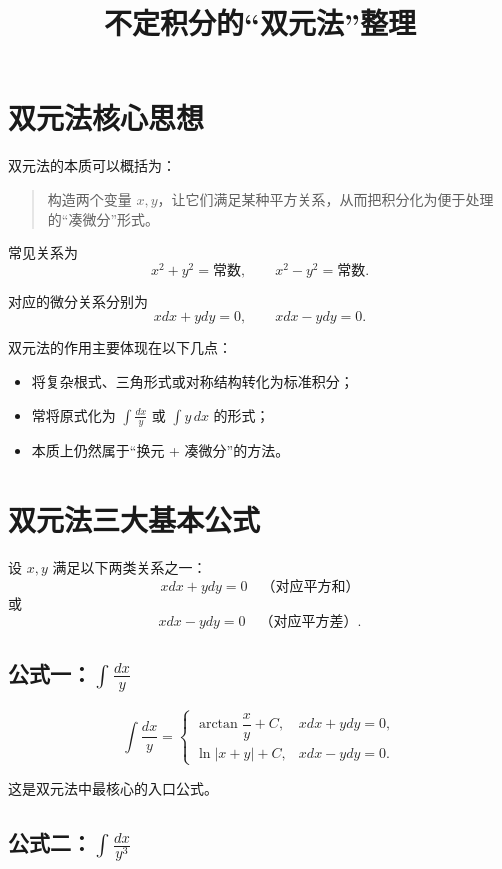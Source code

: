 \documentclass[UTF8,a4paper,12pt]{ctexart}
\title{不定积分的“双元法”整理}
\author{}
\date{}
\begin{document}
\maketitle
\tableofcontents
\newpage

\section{双元法核心思想}

双元法的本质可以概括为：

\begin{quote}
  构造两个变量 $x,y$，让它们满足某种平方关系，从而把积分化为便于处理的“凑微分”形式。
\end{quote}

常见关系为
\[
  x^2+y^2=\text{常数},\qquad x^2-y^2=\text{常数}.
\]

对应的微分关系分别为
\[
  xdx+ydy=0,\qquad xdx-ydy=0.
\]

双元法的作用主要体现在以下几点：
\begin{itemize}
  \item 将复杂根式、三角形式或对称结构转化为标准积分；
  \item 常将原式化为 $\int \frac{dx}{y}$ 或 $\int y\,dx$ 的形式；
  \item 本质上仍然属于“换元 + 凑微分”的方法。
\end{itemize}

\section{双元法三大基本公式}

设 $x,y$ 满足以下两类关系之一：
\[
  xdx+ydy=0 \quad \text{（对应平方和）}
\]
或
\[
  xdx-ydy=0 \quad \text{（对应平方差）}.
\]

\subsection{公式一：$\int \frac{dx}{y}$}

\[
  \int \frac{dx}{y}=
  \begin{cases}
    \arctan\dfrac{x}{y}+C, & xdx+ydy=0,\\[1em]
    \ln|x+y|+C, & xdx-ydy=0.
  \end{cases}
\]

这是双元法中最核心的入口公式。

\subsection{公式二：$\int \frac{dx}{y^3}$}
\end{document}
